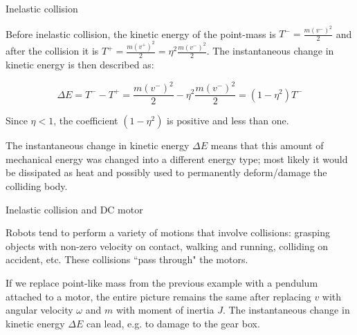 \documentclass{beamer}
\begin{document}
\begin{frame}{Inelastic collision}
	\begin{flushleft}
		
		Before inelastic collision, the kinetic energy of the point-mass is $T^- = \frac{m(v^-)^2}{2}$ and after the collision it is $T^+ = \frac{m(v^+)^2}{2} = \eta^2 \frac{m(v^-)^2}{2}$. The instantaneous change in kinetic energy is then described as:
		
		\begin{equation}
			\Delta E = T^- - T^+ = \frac{m(v^-)^2}{2} - \eta^2 \frac{m(v^-)^2}{2}  = (1 - \eta^2) T^-
		\end{equation}
	
		Since $\eta < 1$, the coefficient $(1 - \eta^2)$ is positive and less than one.
		
		\bigskip
		
		The instantaneous change in kinetic energy $\Delta E$ means that this amount of mechanical energy was changed into a different energy type; most likely it would be dissipated as heat and possibly used to permanently deform/damage the colliding body.
		
	\end{flushleft}
\end{frame}



\begin{frame}{Inelastic collision and DC motor}
	\begin{flushleft}
		
		Robots tend to perform a variety of motions that involve collisions: grasping objects with non-zero velocity on contact, walking and running, colliding on accident, etc. These collisions ``pass through" the motors.
		
		\bigskip
		
		If we replace point-like mass from the previous example with a pendulum attached to a motor, the entire picture remains the same after replacing $v$ with angular velocity $\omega$ and $m$ with moment of inertia $J$. The instantaneous change in kinetic energy $\Delta E$ can lead, e.g. to damage to the gear box.
		
	\end{flushleft}
\end{frame}
\end{document}
